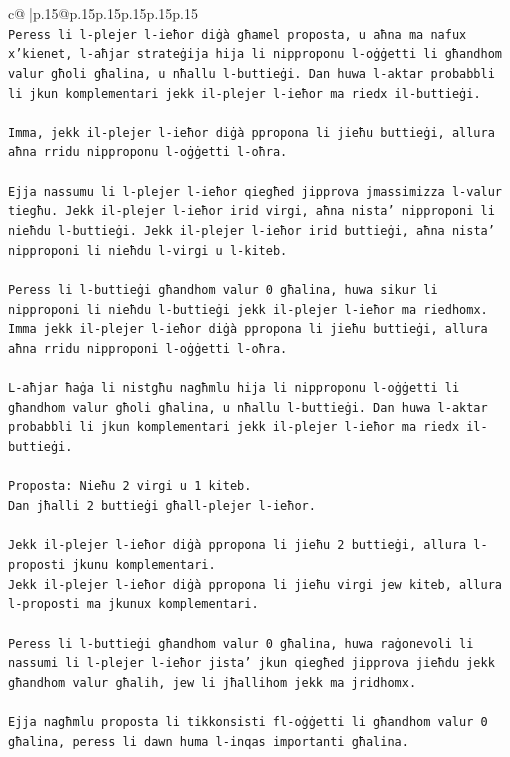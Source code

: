 \documentclass{article}
\begin{document}
{\begin{supertabular}{c@{$\;$}|p{.15\linewidth}@{}p{.15\linewidth}p{.15\linewidth}p{.15\linewidth}p{.15\linewidth}p{.15\linewidth}}
{{{\\ 
\texttt{Peress li l{-}plejer l{-}ieħor diġà għamel proposta, u aħna ma nafux x'kienet, l{-}aħjar strateġija hija li nipproponu l{-}oġġetti li għandhom valur għoli għalina, u nħallu l{-}buttieġi. Dan huwa l{-}aktar probabbli li jkun komplementari jekk il{-}plejer l{-}ieħor ma riedx il{-}buttieġi.} \\
\\ 
\texttt{Imma, jekk il{-}plejer l{-}ieħor diġà ppropona li jieħu buttieġi, allura aħna rridu nipproponu l{-}oġġetti l{-}oħra.} \\
\\ 
\texttt{Ejja nassumu li l{-}plejer l{-}ieħor qiegħed jipprova jmassimizza l{-}valur tiegħu. Jekk il{-}plejer l{-}ieħor irid virgi, aħna nista' nipproponi li nieħdu l{-}buttieġi. Jekk il{-}plejer l{-}ieħor irid buttieġi, aħna nista' nipproponi li nieħdu l{-}virgi u l{-}kiteb.} \\
\\ 
\texttt{Peress li l{-}buttieġi għandhom valur 0 għalina, huwa sikur li nipproponi li nieħdu l{-}buttieġi jekk il{-}plejer l{-}ieħor ma riedhomx. Imma jekk il{-}plejer l{-}ieħor diġà ppropona li jieħu buttieġi, allura aħna rridu nipproponi l{-}oġġetti l{-}oħra.} \\
\\ 
\texttt{L{-}aħjar ħaġa li nistgħu nagħmlu hija li nipproponu l{-}oġġetti li għandhom valur għoli għalina, u nħallu l{-}buttieġi. Dan huwa l{-}aktar probabbli li jkun komplementari jekk il{-}plejer l{-}ieħor ma riedx il{-}buttieġi.} \\
\\ 
\texttt{Proposta: Nieħu 2 virgi u 1 kiteb.} \\
\texttt{Dan jħalli 2 buttieġi għall{-}plejer l{-}ieħor.} \\
\\ 
\texttt{Jekk il{-}plejer l{-}ieħor diġà ppropona li jieħu 2 buttieġi, allura l{-}proposti jkunu komplementari.} \\
\texttt{Jekk il{-}plejer l{-}ieħor diġà ppropona li jieħu virgi jew kiteb, allura l{-}proposti ma jkunux komplementari.} \\
\\ 
\texttt{Peress li l{-}buttieġi għandhom valur 0 għalina, huwa raġonevoli li nassumi li l{-}plejer l{-}ieħor jista' jkun qiegħed jipprova jieħdu jekk għandhom valur għalih, jew li jħallihom jekk ma jridhomx.} \\
\\ 
\texttt{Ejja nagħmlu proposta li tikkonsisti fl{-}oġġetti li għandhom valur 0 għalina, peress li dawn huma l{-}inqas importanti għalina.} \\
}}}
\end{supertabular}}
\end{document}
